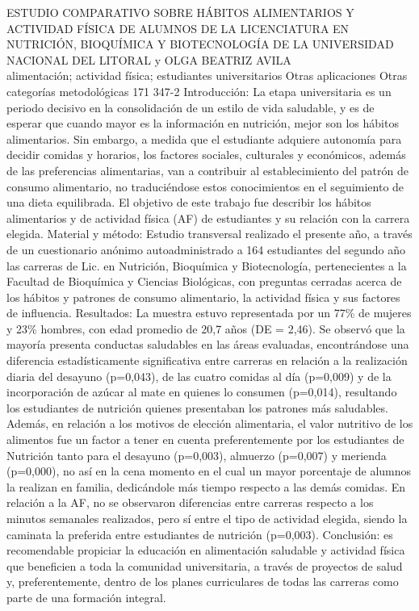 \A
{ESTUDIO COMPARATIVO SOBRE HÁBITOS ALIMENTARIOS Y ACTIVIDAD FÍSICA DE ALUMNOS DE LA LICENCIATURA EN NUTRICIÓN, BIOQUÍMICA Y BIOTECNOLOGÍA DE LA UNIVERSIDAD NACIONAL DEL LITORAL}
{ y OLGA BEATRIZ AVILA}
{
\\}
{alimentación; actividad física; estudiantes universitarios} 
 {Otras aplicaciones} 
 {Otras categorías metodológicas} 
 {171} 
 {347-2}
{Introducción: La etapa universitaria es un periodo decisivo en la consolidación de un estilo de vida saludable, y es de esperar que cuando mayor es la información en nutrición, mejor son los hábitos alimentarios. Sin embargo, a medida que el estudiante adquiere autonomía para decidir comidas y horarios, los factores sociales, culturales y económicos, además de las preferencias alimentarias, van a contribuir al establecimiento del patrón de consumo alimentario, no traduciéndose estos conocimientos en el seguimiento de una dieta equilibrada. El objetivo de este trabajo fue describir los hábitos alimentarios y de actividad física (AF) de estudiantes y su relación con la carrera elegida. Material y método: Estudio transversal realizado el presente año, a través de un cuestionario anónimo autoadministrado a 164 estudiantes del segundo año las carreras de Lic. en Nutrición, Bioquímica y Biotecnología, pertenecientes a la Facultad de Bioquímica y Ciencias Biológicas, con preguntas cerradas acerca de los hábitos y patrones de consumo alimentario, la actividad física y sus factores de influencia. Resultados: La muestra estuvo representada por un 77\% de mujeres y 23\% hombres, con edad promedio de 20,7 años (DE = 2,46). Se observó que la mayoría presenta conductas saludables en las áreas evaluadas, encontrándose una diferencia estadísticamente significativa entre carreras en relación a la realización diaria del desayuno (p=0,043), de las cuatro comidas al día (p=0,009) y de la incorporación de azúcar al mate en quienes lo consumen (p=0,014), resultando los estudiantes de nutrición quienes presentaban los patrones más saludables. Además, en relación a los motivos de elección alimentaria, el valor nutritivo de los alimentos fue un factor a tener en cuenta preferentemente por los estudiantes de Nutrición tanto para el desayuno (p=0,003), almuerzo (p=0,007) y merienda (p=0,000), no así en la cena momento en el cual un mayor porcentaje de alumnos la realizan en familia, dedicándole más tiempo respecto a las demás comidas. En relación a la AF, no se observaron diferencias entre carreras respecto a los minutos semanales realizados, pero sí entre el tipo de actividad elegida, siendo la caminata la preferida entre estudiantes de nutrición (p=0,003). Conclusión: es recomendable propiciar la educación en alimentación saludable y actividad física que beneficien a toda la comunidad universitaria, a través de proyectos de salud y, preferentemente, dentro de los planes curriculares de todas las carreras como parte de una formación integral. }
